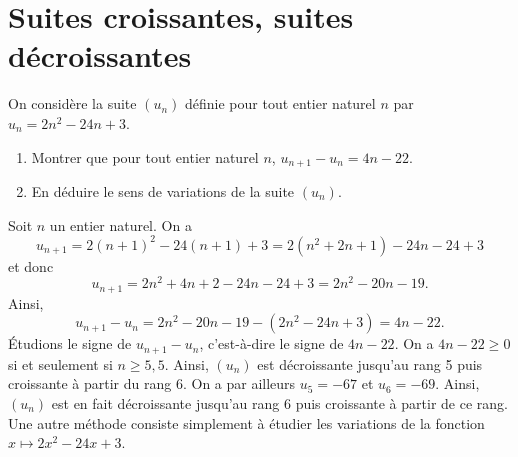 \documentclass[11pt,fleqn]{book} %
\begin{document}
\section*{Suites croissantes, suites décroissantes}

\begin{exercise}
On considère la suite $(u_n)$ définie pour tout entier naturel $n$ par $u_n=2n^2-24n+3$.
\begin{enumerate}
\item Montrer que pour tout entier naturel $n$, $u_{n+1}-u_n = 4n-22$.
\item En déduire le sens de variations de la suite $(u_n)$.
\end{enumerate}\end{exercise}


\begin{solution}Soit $n$ un entier naturel. On a
\[ u_{n+1}=2(n+1)^2-24(n+1)+3=2(n^2+2n+1)-24n-24+3\]
et donc
\[u_{n+1}=2n^2+4n+2-24n-24+3=2n^2-20n-19.\]
Ainsi,
\[ u_{n+1}-u_n = 2n^2-20n-19-(2n^2-24n+3)=4n-22.\]
Étudions le signe de $u_{n+1}-u_n$, c'est-à-dire le signe de $4n-22$. On a $4n-22 \geqslant 0$ si et seulement si $n \geqslant 5,5$. Ainsi, $(u_n)$ est décroissante jusqu'au rang 5 puis croissante à partir du rang 6. On a par ailleurs $u_5=-67$ et $u_6=-69$. Ainsi, $(u_n)$ est en fait décroissante jusqu'au rang 6 puis croissante à partir de ce rang. Une autre méthode consiste simplement à étudier les variations de la fonction $x\mapsto 2x^2-24x+3$.\end{solution}
\end{document}
